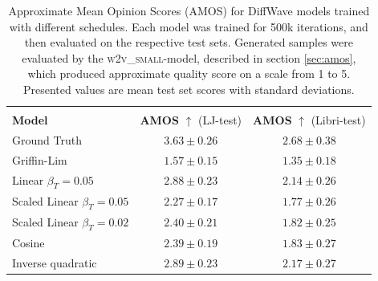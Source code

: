 \documentclass{report}
\begin{document}

\begin{table}[H]
\centering
\def\arraystretch{1.3}
\begin{tabular}{l c c}
    \hline\hline
    \vspace{-0.5cm} \\
    \textbf{Model} & \textbf{AMOS} $\uparrow$ (LJ-test) & \textbf{AMOS} $\uparrow$ (Libri-test) \\ [0.5ex]
    \hline
    Ground Truth & $3.63 \pm 0.26$ & $ 2.68 \pm 0.38$ \\
    \hline
    Griffin-Lim & $1.57 \pm 0.15$ & $ 1.35 \pm 0.18 $\\
    \hline
    \hline
    Linear $\beta_T=0.05$ & $2.88 \pm 0.23$ & $ 2.14 \pm 0.26 $\\ 
    \hline
    Scaled Linear $\beta_T = 0.05$ & $2.27 \pm 0.17$ & $ 1.77 \pm 0.26 $\\
    \hline
    Scaled Linear $\beta_T = 0.02$ & $ 2.40 \pm 0.21$ & $ 1.82 \pm 0.25 $\\
    \hline
    Cosine & $2.39 \pm 0.19$ & $ 1.83 \pm 0.27 $\\
    \hline
    Inverse quadratic & $2.89 \pm 0.23$ & $ 2.17 \pm 0.27 $\\
    \hline\hline
\end{tabular}
\caption{\onehalfspacing Approximate Mean Opinion Scores (AMOS) for DiffWave models trained with different schedules. Each model was trained for 500k iterations, and then evaluated on the respective test sets. Generated samples were evaluated by the \textsc{w2v\_small}-model, described in section \ref{sec:amos}, which produced approximate quality score on a scale from 1 to 5. Presented values are mean test set scores with standard deviations.}
\label{table:sched-amos}
\end{table}
\end{document}
